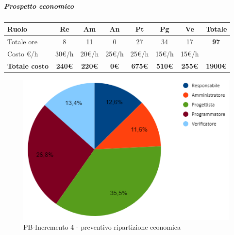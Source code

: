 \subparagraph{Prospetto economico}
\begin{center}
	\renewcommand{\arraystretch}{1.8} %
	\begin{tabular}{ |m{10em}|c|c|c|c|c|c|c| }
	\hline
	\textbf{Ruolo} & \textbf{Re} & \textbf{Am} &  \textbf{An} &  \textbf{Pt} &  \textbf{Pg} &  \textbf{Ve} &  \textbf{Totale}\\
    \hline
    Totale ore & 8 & 11 & 0 & 27 & 34 & 17 & \textbf{97}\\
    \hline
    Costo \euro/h & 30\euro/h & 20\euro/h & 25\euro/h & 25\euro/h & 15\euro/h & 15\euro/h & \\
    \hline
    \textbf{Totale costo} & \textbf{240\euro} & \textbf{220\euro} &  \textbf{0\euro} &  \textbf{675\euro} &  \textbf{510\euro} &  \textbf{255\euro} &  \textbf{1900\euro}\\
    \hline
	\end{tabular}

    \begin{figure}[H]
       \centering\includegraphics{images/preventivo/PB-incremento4-costo.png}
       \caption{PB-Incremento 4 - preventivo ripartizione economica}
    \end{figure}
\end{center}

\newpage